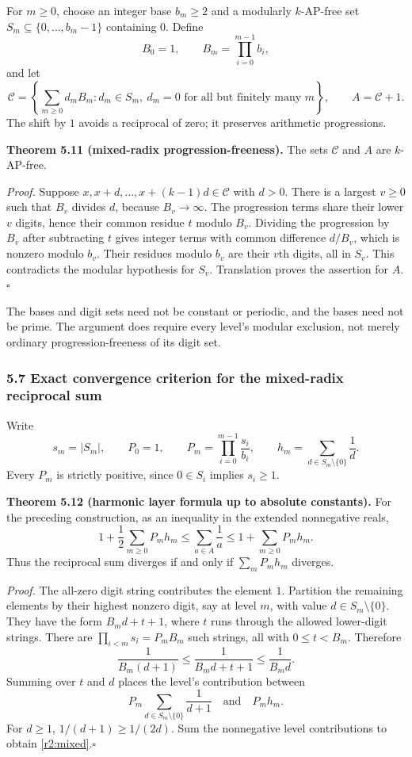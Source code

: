 For $m\ge0$, choose an integer base $b_m\ge2$ and a modularly $k$-AP-free set $S_m\subseteq\{0,\ldots,b_m-1\}$ containing $0$. Define
\[
B_0=1,\qquad B_m=\prod_{i=0}^{m-1}b_i,
\]
and let
\[
\mathcal C=\left\{\sum_{m\ge0}d_mB_m:
 d_m\in S_m,\ d_m=0\text{ for all but finitely many }m\right\},
\qquad A=\mathcal C+1.
\]
The shift by $1$ avoids a reciprocal of zero; it preserves arithmetic progressions.

\noindent\textbf{Theorem 5.11 (mixed-radix progression-freeness).}
The sets $\mathcal C$ and $A$ are $k$-AP-free.

\noindent\emph{Proof.}
Suppose $x,x+d,\ldots,x+(k-1)d\in\mathcal C$ with $d>0$. There is a largest $v\ge0$ such that $B_v$ divides $d$, because $B_v\to\infty$. The progression terms share their lower $v$ digits, hence their common residue $t$ modulo $B_v$. Dividing the progression by $B_v$ after subtracting $t$ gives integer terms with common difference $d/B_v$, which is nonzero modulo $b_v$. Their residues modulo $b_v$ are their $v$th digits, all in $S_v$. This contradicts the modular hypothesis for $S_v$. Translation proves the assertion for $A$.\hfill$\square$

The bases and digit sets need not be constant or periodic, and the bases need not be prime. The argument does require every level's modular exclusion, not merely ordinary progression-freeness of its digit set.

\subsubsection{5.7 Exact convergence criterion for the mixed-radix reciprocal sum}

Write
\[
s_m=|S_m|,\qquad
P_0=1,\qquad P_m=\prod_{i=0}^{m-1}\frac{s_i}{b_i},
\qquad h_m=\sum_{d\in S_m\setminus\{0\}}\frac1d.
\]
Every $P_m$ is strictly positive, since $0\in S_i$ implies $s_i\ge1$.

\noindent\textbf{Theorem 5.12 (harmonic layer formula up to absolute constants).}
For the preceding construction, as an inequality in the extended nonnegative reals,
\begin{equation}\label{r2:mixed}
1+\frac12\sum_{m\ge0}P_mh_m
\le\sum_{a\in A}\frac1a
\le1+\sum_{m\ge0}P_mh_m.
\end{equation}
Thus the reciprocal sum diverges if and only if $\sum_mP_mh_m$ diverges.

\noindent\emph{Proof.}
The all-zero digit string contributes the element $1$. Partition the remaining elements by their highest nonzero digit, say at level $m$, with value $d\in S_m\setminus\{0\}$. They have the form $B_md+t+1$, where $t$ runs through the allowed lower-digit strings. There are $\prod_{i<m}s_i=P_mB_m$ such strings, all with $0\le t<B_m$. Therefore
\[
\frac1{B_m(d+1)}\le\frac1{B_md+t+1}\le\frac1{B_md}.
\]
Summing over $t$ and $d$ places the level's contribution between
\[
P_m\sum_{d\in S_m\setminus\{0\}}\frac1{d+1}
\quad\text{and}\quad P_m h_m.
\]
For $d\ge1$, $1/(d+1)\ge1/(2d)$. Sum the nonnegative level contributions to obtain \eqref{r2:mixed}.\hfill$\square$

